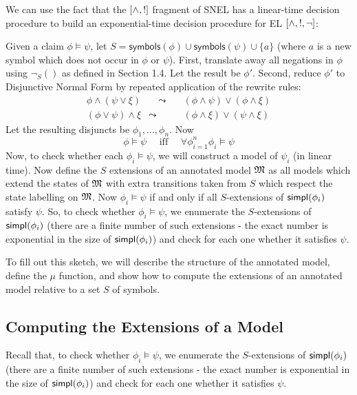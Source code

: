 \NI We can use the fact that the $[\land, !]$ fragment of SNEL
has a linear-time decision procedure to build an exponential-time
decision procedure for EL $[\land, !, \neg]$:

Given a claim $\phi \models \psi$, let $S = \mathsf{symbols}(\phi) \cup \mathsf{symbols}(\psi) \cup \{a\}$ (where $a$ is a new symbol which does not occur in $\phi$ or $\psi$).
First, translate away all negations in $\phi$ using $\neg_S()$ as defined in Section 1.4.
Let the result be $\phi'$.
Second, reduce $\phi'$ to Disjunctive Normal Form by repeated application of the rewrite rules:
\begin{eqnarray*}
\phi \land (\psi \lor \xi) & \quad \leadsto \quad& (\phi \land \psi) \lor (\phi \land \xi)  \\
(\phi \lor \psi) \land \xi & \leadsto & (\phi \land \xi) \lor (\psi \land \xi) 
\end{eqnarray*}
Let the resulting disjuncts be $\phi_1, ..., \phi_n$. 
Now 
\[
\phi \models \psi \quad\text{ iff }\quad \forall \phi_{i=1}^n \phi_i \models \psi
\]
Now, to check whether each $\phi_i \models \psi$, we will construct a
model of $\psi_i$ (in linear time).  Now define the $S$ extensions of
an annotated model $\frak{M}$ as all models which extend the states of
$\frak{M}$ with extra transitions taken from $S$ which respect the state
labelling on $\frak{M}$.  Now $\phi_i \models \psi$ if and only if all
$S$-extensions of $\mathsf{simpl}(\phi_i)$ satisfy $\psi$.  So, to check
whether $\phi_i \models \psi$, we enumerate the $S$-extensions of
$\mathsf{simpl}(\phi_i)$ (there are a finite number of such extensions - the
exact number is exponential in the size of $\mathsf{simpl}(\phi_i)$) and check
for each one whether it satisfies $\psi$.

To fill out this sketch, we will describe the structure of the
annotated model, define the $\mu$ function, and show how to compute
the extensions of an annotated model relative to a set $S$ of symbols.


\subsection{Computing the Extensions of a Model}

Recall that, to check whether $\phi_i \models \psi$, we enumerate the $S$-extensions of $\mathsf{simpl}(\phi_i)$ (there are a finite number of such extensions - the exact number is exponential in the size of $\mathsf{simpl}(\phi_i)$) and check for each one whether it satisfies $\psi$.


